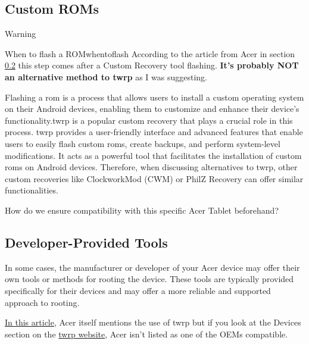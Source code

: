 \subsection{Custom ROMs}
Warning \faRadiation

\begin{mydef}{When to flash a ROM}{whentoflash}
According to the article from Acer in section \ref{subsec:dev-tools} this step comes after a Custom Recovery tool flashing. \textbf{It's probably NOT an alternative method to \gls{twrp}} as I was suggesting.
\end{mydef}

Flashing a \gls{rom} is a process that allows users to install a custom operating system on their Android devices, enabling them to customize and enhance their device's functionality.\gls{twrp} is a popular custom recovery that plays a crucial role in this process. \gls{twrp} provides a user-friendly interface and advanced features that enable users to easily flash custom \gls{rom}s, create backups, and perform system-level modifications. It acts as a powerful tool that facilitates the installation of custom \gls{rom}s on Android devices. Therefore, when discussing alternatives to \gls{twrp}, other custom recoveries like ClockworkMod (CWM) or PhilZ Recovery can offer similar functionalities.


How do we ensure compatibility with this specific Acer Tablet beforehand?

\subsection{Developer-Provided Tools}
\label{subsec:dev-tools}
In some cases, the manufacturer or developer of your Acer device may offer their own tools or methods for rooting the device. These tools are typically provided specifically for their devices and may offer a more reliable and supported approach to rooting.

\href{https://blog.acer.com/en/discussion/616/rooting-your-phone-your-complete-guide-2023}{In this article}, Acer itself mentions the use of \gls{twrp} but if you look at the Devices section on the \href{https://twrp.me/Devices/}{\gls{twrp} website}, Acer isn't listed as one of the OEMs compatible. \faHospital


